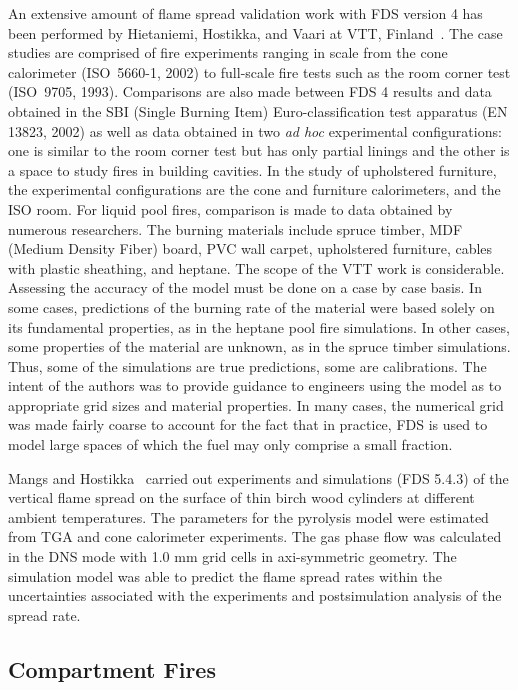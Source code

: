 An extensive amount of flame spread validation work with FDS version 4 has been performed  by  Hietaniemi,  Hostikka,  and  Vaari  at  VTT, Finland~\cite{Hietaniemi:1}. The case studies are comprised of fire experiments ranging in scale from the cone calorimeter (ISO~5660-1, 2002) to full-scale fire tests such as the room corner test (ISO~9705, 1993). Comparisons are also made between FDS 4 results and data obtained in the SBI (Single Burning Item) Euro-classification test apparatus (EN 13823, 2002) as well as data obtained in two {\em ad hoc} experimental configurations: one is similar to the room corner test but has only partial linings and the other is a space to study fires in building cavities. In the study of upholstered furniture, the experimental configurations are the cone and furniture calorimeters, and the ISO room. For liquid pool fires, comparison is made to data obtained by numerous researchers.  The burning materials include spruce timber, MDF (Medium Density Fiber) board, PVC wall carpet, upholstered furniture, cables with plastic sheathing, and heptane. The scope of the VTT work is considerable. Assessing the accuracy of the model must be done on a case by case basis. In some cases, predictions of the burning rate of the material were based solely on its fundamental properties, as in the heptane pool fire simulations. In other cases, some properties of the material are unknown, as in the spruce timber simulations. Thus, some of the simulations are true predictions, some are calibrations. The intent of the authors was to provide guidance to engineers using the model as to appropriate grid sizes and material properties. In many cases, the numerical grid was made fairly coarse to account for the fact that in practice, FDS is used to model large spaces of which the fuel may only comprise a small fraction.

Mangs and Hostikka~\cite{Mangs_Hostikka:IAFSS10} carried out experiments and simulations (FDS 5.4.3) of the vertical flame spread on the surface of thin birch wood cylinders at different ambient temperatures. The parameters for the pyrolysis model were estimated from TGA and cone calorimeter experiments. The gas phase flow was calculated in the DNS mode with 1.0 mm grid cells in axi-symmetric geometry. The simulation model was able to predict the flame spread rates within the uncertainties associated with the experiments and postsimulation analysis of the spread rate.


\subsection{Compartment Fires}

